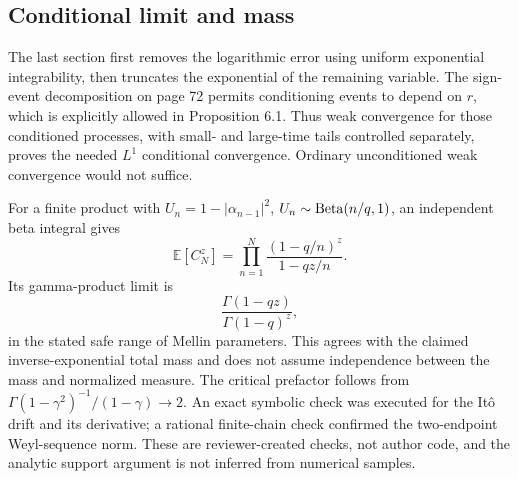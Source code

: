 \documentclass[10pt]{article}
\begin{document}
\subsection*{Conditional limit and mass}
The last section first removes the logarithmic error using uniform exponential integrability, then truncates the exponential of the remaining variable. The sign-event decomposition on page 72 permits conditioning events to depend on \(r\), which is explicitly allowed in Proposition 6.1. Thus weak convergence for those conditioned processes, with small- and large-time tails controlled separately, proves the needed \(L^1\) conditional convergence. Ordinary unconditioned weak convergence would not suffice.\par
For a finite product with \(U_n=1-|\alpha_{n-1}|^2\), \(U_n\sim{\rm Beta}(n/q,1)\), an independent beta integral gives \[\mathbb E[C_N^z]
   =\prod_{n=1}^N\frac{(1-q/n)^z}{1-qz/n}.\] Its gamma-product limit is \[\frac{\Gamma(1-qz)}{\Gamma(1-q)^z},\] in the stated safe range of Mellin parameters. This agrees with the claimed inverse-exponential total mass and does not assume independence between the mass and normalized measure. The critical prefactor follows from \(\Gamma(1-\gamma^2)^{-1}/(1-\gamma)\to2\). An exact symbolic check was executed for the Itô drift and its derivative; a rational finite-chain check confirmed the two-endpoint Weyl-sequence norm. These are reviewer-created checks, not author code, and the analytic support argument is not inferred from numerical samples.\par
\end{document}
